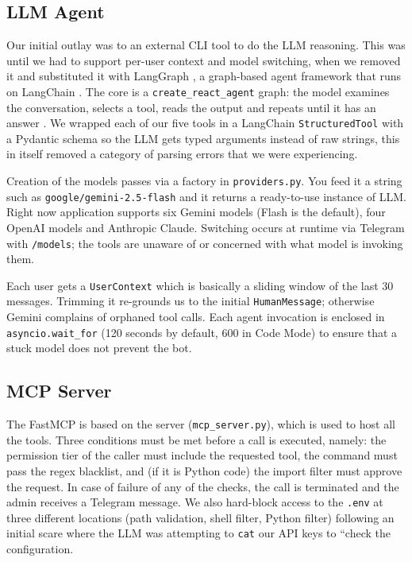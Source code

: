 \documentclass[conference]{IEEEtran}
\begin{document}
\subsection{LLM Agent}
Our initial outlay was to an external CLI tool to do the LLM reasoning. This was until we had to support per-user context and model switching, when we removed it and substituted it with LangGraph \cite{langgraph2024}, a graph-based agent framework that runs on LangChain \cite{langchain2024}. The core is a \texttt{create\_react\_agent} graph: the model examines the conversation, selects a tool, reads the output and repeats until it has an answer \cite{yao2023react}. We wrapped each of our five tools in a LangChain \texttt{StructuredTool} with a Pydantic schema so the LLM gets typed arguments instead of raw strings, this in itself removed a category of parsing errors that we were experiencing.
 
Creation of the models passes via a factory in \texttt{providers.py}. You feed it a string such as \texttt{google/gemini-2.5-flash} and it returns a ready-to-use instance of LLM. Right now application  supports six Gemini models (Flash is the default), four OpenAI models and Anthropic Claude. Switching occurs at runtime via Telegram with \texttt{/models}; the tools are unaware of or concerned with what model is invoking them.

Each user gets a \texttt{UserContext} which is basically a sliding window of the last 30 messages.  Trimming it re-grounds us to the initial \texttt{HumanMessage}; otherwise Gemini complains of orphaned tool calls. Each agent invocation is enclosed in \texttt{asyncio.wait\_for} (120 seconds by default, 600 in Code Mode) to ensure that a stuck model does not prevent the bot.

\subsection{MCP Server}
The FastMCP is based on the server (\texttt{mcp\_server.py}), which is used to host all the tools. Three conditions must be met before a call is executed, namely: the permission tier of the caller must include the requested tool, the command must pass the regex blacklist, and (if it is Python code) the import filter must approve the request.
In case of failure of any of the checks, the call is terminated and the admin receives a Telegram message.
We also hard-block access to the \texttt{.env} at three different locations (path validation, shell filter, Python filter) following an initial scare where the LLM was attempting to \texttt{cat} our API keys to ``check the configuration.
\end{document}
